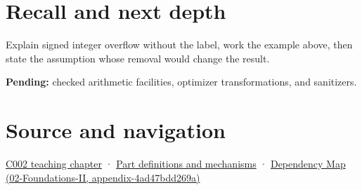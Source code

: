 \section{Recall and next depth}\label{appendix-1a599c924a4e-recall-and-next-depth}

Explain signed integer overflow without the label, work the example above, then state the assumption whose removal would change the result.

\textbf{Pending:} checked arithmetic facilities, optimizer transformations, and sanitizers.

\section{Source and navigation}\label{appendix-1a599c924a4e-source-and-navigation}

\href{Continuous\%20Notes/Computing\%20Foundations\%20-\%20From\%20Bits\%20to\%20C++\%20and\%20Systems\%20APIs\#Arithmetic\%20becomes\%20a\%20policy}{C002 teaching chapter} · \hyperref[appendix-fd090d982a15]{Part definitions and mechanisms} · \href{../02-Foundations-II/main.pdf\#nameddest=appendix-4ad47bdd269a}{Dependency Map (02-Foundations-II, appendix-4ad47bdd269a)}

